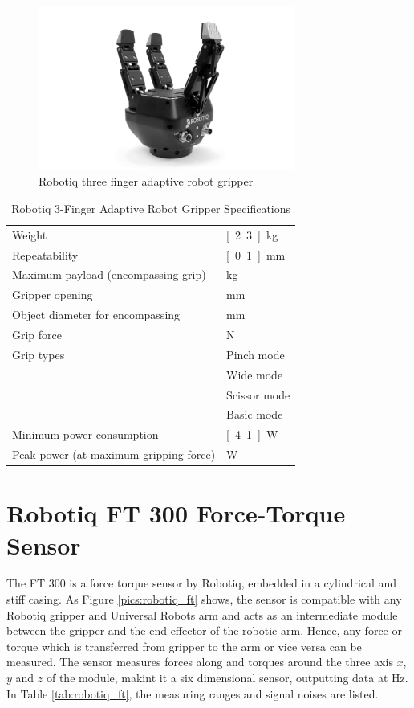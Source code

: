 \begin{figure}[h]
   \centering
   \includegraphics[width=0.75\textwidth]{images/robotiq_gripper.jpg}
   \caption{Robotiq three finger adaptive robot gripper}
   \label{pics:robotiq_gripper}
\end{figure}

\begin{table}[h]
\begin{center}
 \caption{Robotiq 3-Finger Adaptive Robot Gripper Specifications}\vspace{1ex}
 \label{tab:robotiq_gripper}
 \begin{tabular}{ll}
 \hline
 Weight & \unit[2.3]{kg}\\
 Repeatability & \unit[0.1]{mm} \\
 Maximum payload (encompassing grip) & \unit[10]{kg}\\
 Gripper opening & \unit[0 to 155]{mm} \\
 Object diameter for encompassing & \unit[20 to 155]{mm}\\
 Grip force & \unit[30 to 70]{N} \\
 Grip types & Pinch mode \\
 & Wide mode \\
 & Scissor mode \\
 & Basic mode \\
 Minimum power consumption & \unit[4.1]{W} \\
 Peak power (at maximum gripping force) & \unit[36]{W}\\
 \hline
 \end{tabular}
\end{center}
\end{table}

\section{Robotiq FT 300 Force-Torque Sensor}
	\label{sec:ft300}
The FT 300 is a force torque sensor by Robotiq, embedded in a cylindrical and stiff casing. As Figure \ref{pics:robotiq_ft} shows, the sensor is compatible with any Robotiq gripper and Universal Robots arm and acts as an intermediate module between the gripper and the end-effector of the robotic arm. Hence, any force or torque which is transferred from gripper to the arm or vice versa can be measured. The sensor measures forces along and torques around the three axis $x$, $y$ and $z$ of the module, makint it a six dimensional sensor, outputting data at \unit[100]{Hz}. In Table \ref{tab:robotiq_ft}, the measuring ranges and signal noises are listed.

